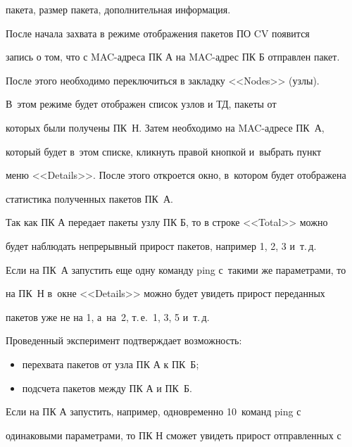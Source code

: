 пакета, размер пакета, дополнительная информация.





   После начала захвата в режиме отображения пакетов ПО CV появится


запись о том, что с MAC-адреса ПК А на MAC-ад\-рес ПК Б отправлен пакет.


После этого необходимо переключиться в закладку <<Nodes>> (узлы).


В~этом режиме будет отображен список узлов и ТД, пакеты от


которых были получены ПК~Н. Затем необходимо на MAC-ад\-ре\-се ПК~А,


который будет в~этом списке, кликнуть правой кнопкой и~выбрать пункт


меню <<Details>>. После этого откроется окно, в~котором будет отображена


статистика полученных пакетов ПК~А.





   Так как ПК А передает пакеты узлу ПК Б, то в строке <<Total>> можно


будет наблюдать непрерывный прирост пакетов, например 1, 2, 3 и~т.\,д.


Если на ПК~А запустить еще одну команду ping с~такими же параметрами, то


на ПК~Н в~окне <<Details>> можно будет увидеть прирост переданных


пакетов уже не на 1, а~на~2, т.\,е.\ 1, 3, 5 и~т.\,д.





   Проведенный эксперимент подтверждает возможность:


   \begin{itemize}


\item перехвата пакетов от узла ПК А к ПК~Б;\\[-14pt]


\item подсчета пакетов между ПК А и ПК~Б.


\end{itemize}





   Если на ПК А запустить, например, одновременно 10~команд ping с


одинаковыми параметрами, то ПК Н сможет увидеть прирост отправленных с


